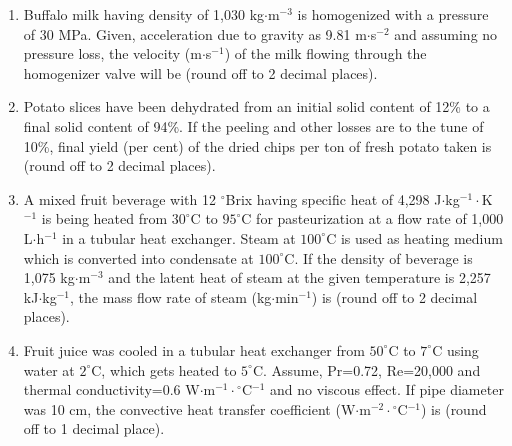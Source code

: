 \documentclass[journal,12pt,onecolumn]{IEEEtran}
\begin{document}
\begin{enumerate}[label=\arabic*)]
\vspace{0.5cm}

\item Buffalo milk having density of 1,030 kg$\cdot$m$^{-3}$ is homogenized with a pressure of 30 MPa. Given, acceleration due to gravity as 9.81 m$\cdot$s$^{-2}$ and assuming no pressure loss, the velocity (m$\cdot$s$^{-1}$) of the milk flowing through the homogenizer valve will be \underline{\hspace{2cm}} (round off to 2 decimal places).
\vspace{0.05cm}
\hfill{} \\

\vspace{0.5cm}

\item Potato slices have been dehydrated from an initial solid content of 12\% to a final solid content of 94\%. If the peeling and other losses are to the tune of 10\%, final yield (per cent) of the dried chips per ton of fresh potato taken is \underline{\hspace{2cm}} (round off to 2 decimal places).
\hfill{} \\

\vspace{0.5cm}

\item A mixed fruit beverage with 12 $^\circ$Brix having specific heat of 4,298 J$\cdot$kg$^{-1}\cdot$K$^{-1}$ is being heated from $30^\circ$C to $95^\circ$C for pasteurization at a flow rate of 1,000 L$\cdot$h$^{-1}$ in a tubular heat exchanger. Steam at $100^\circ$C is used as heating medium which is converted into condensate at $100^\circ$C. If the density of beverage is 1,075 kg$\cdot$m$^{-3}$ and the latent heat of steam at the given temperature is 2,257 kJ$\cdot$kg$^{-1}$, the mass flow rate of steam (kg$\cdot$min$^{-1}$) is \underline{\hspace{2cm}} (round off to 2 decimal places).
\hfill{} \\

\vspace{0.5cm}

\item Fruit juice was cooled in a tubular heat exchanger from $50^\circ$C to $7^\circ$C using water at $2^\circ$C, which gets heated to $5^\circ$C. Assume, Pr=0.72, Re=20,000 and thermal conductivity=0.6 W$\cdot$m$^{-1}\cdot{}^\circ$C$^{-1}$ and no viscous effect. If pipe diameter was 10 cm, the convective heat transfer coefficient (W$\cdot$m$^{-2}\cdot{}^\circ$C$^{-1}$) is \underline{\hspace{2cm}} (round off to 1 decimal place).
\hfill{} \\


\end{enumerate}
\end{document}

